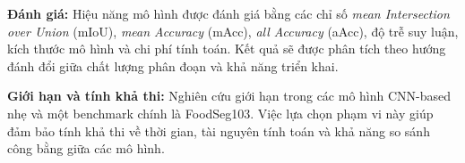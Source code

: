 \textbf{Đánh giá:} Hiệu năng mô hình được đánh giá bằng các chỉ số \textit{mean Intersection over Union} (mIoU), \textit{mean Accuracy} (mAcc), \textit{all Accuracy} (aAcc), độ trễ suy luận, kích thước mô hình và chi phí tính toán. Kết quả sẽ được phân tích theo hướng đánh đổi giữa chất lượng phân đoạn và khả năng triển khai.

\textbf{Giới hạn và tính khả thi:} Nghiên cứu giới hạn trong các mô hình CNN-based nhẹ và một benchmark chính là FoodSeg103. Việc lựa chọn phạm vi này giúp đảm bảo tính khả thi về thời gian, tài nguyên tính toán và khả năng so sánh công bằng giữa các mô hình.

